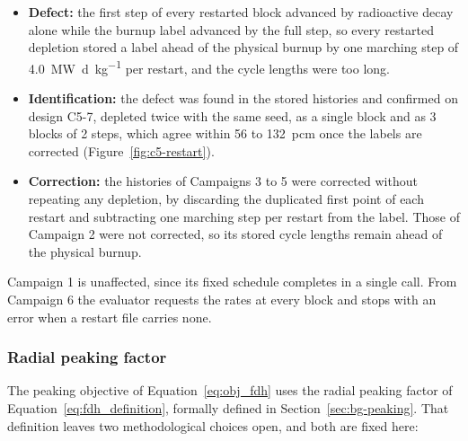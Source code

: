 \begin{itemize}
  \item \textbf{Defect:} the first step of every restarted block advanced
        by radioactive decay alone while the burnup label advanced by the
        full step, so every restarted depletion stored a label ahead of
        the physical burnup by one marching step of
        \SI{4.0}{\mega\watt\day\per\kilo\gram} per restart, and the cycle
        lengths were too long.
  \item \textbf{Identification:} the defect was found in the stored
        histories and confirmed on design C5-7, depleted twice with the
        same seed, as a single block and as 3 blocks of 2 steps, which
        agree within 56 to \SI{132}{pcm} once the labels are corrected
        (Figure~\ref{fig:c5-restart}).
  \item \textbf{Correction:} the histories of Campaigns 3 to 5 were
        corrected without repeating any depletion, by discarding the duplicated first point
        of each restart and subtracting one marching step per restart from
        the label. Those of Campaign 2 were not corrected, so its stored
        cycle lengths remain ahead of the physical burnup.
\end{itemize}

Campaign 1 is unaffected, since its fixed schedule completes in a single
call. From Campaign 6 the evaluator requests the rates at every block and
stops with an error when a restart file carries none.

\subsubsection{Radial peaking factor}
\label{sec:meth-fdh}

The peaking objective of Equation~\eqref{eq:obj_fdh} uses the radial
peaking factor of Equation~\eqref{eq:fdh_definition}, formally defined
in Section~\ref{sec:bg-peaking}. That definition leaves two
methodological choices open, and both are fixed here:

